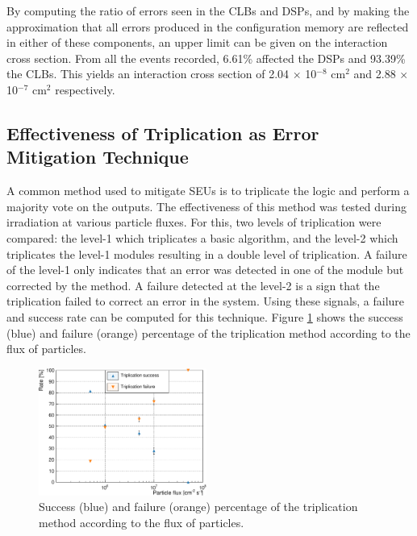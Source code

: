       By computing the ratio of errors seen in the CLBs and DSPs, and by making the approximation that all errors produced in the configuration memory are reflected in either of these components, an upper limit can be given on the interaction cross section. From all the events recorded, 6.61\% affected the DSPs and 93.39\% the CLBs. This yields an interaction cross section of 2.04 $ \times $ 10$^{-8}$ cm$^{2}$ and 2.88 $ \times $ 10$^{-7}$ cm$^{2}$ respectively.

    \subsection{Effectiveness of Triplication as Error Mitigation Technique}

      A common method used to mitigate SEUs is to triplicate the logic and perform a majority vote on the outputs. The effectiveness of this method was tested during irradiation at various particle fluxes. For this, two levels of triplication were compared: the level-1 which triplicates a basic algorithm, and the level-2 which triplicates the level-1 modules resulting in a double level of triplication. A failure of the level-1 only indicates that an error was detected in one of the module but corrected by the method. A failure detected at the level-2 is a sign that the triplication failed to correct an error in the system. Using these signals, a failure and success rate can be computed for this technique. Figure \ref{fig:II-6-data-triplication} shows the success (blue) and failure (orange) percentage of the triplication method according to the flux of particles. \\

      \begin{figure}[h!]
        \centering
        \includegraphics[width=0.49\textwidth]{img/plots/c_l-crop}
        \caption{Success (blue) and failure (orange) percentage of the triplication method according to the flux of particles. }
        \label{fig:II-6-data-triplication}
      \end{figure}

